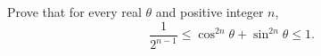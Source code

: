 Prove that for every real $\theta$ and positive integer $n$,
\[\dfrac1{2^{n-1}}\le\cos^{2n}\theta+\sin^{2n}\theta\le1.\]
